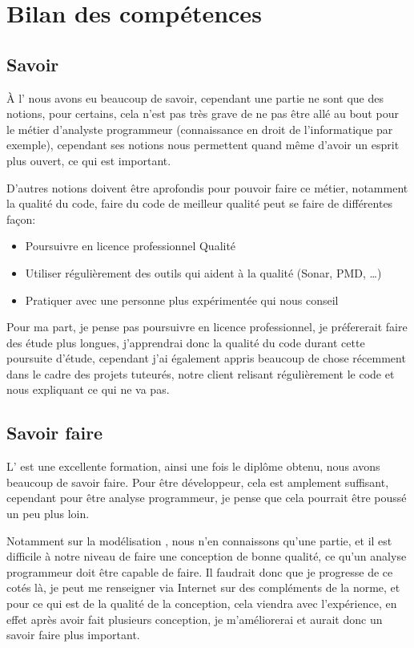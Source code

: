 \documentclass[12pt,a4paper,openany]{article}
\begin{document}
	\section{Bilan des compétences}
	\subsection{Savoir}
	À l' nous avons eu beaucoup de savoir, cependant une partie ne sont que des notions, pour certains, cela n'est pas
	très grave de ne pas être allé au bout pour le métier d'analyste programmeur (connaissance en droit de l'informatique par exemple), cependant
	ses notions nous permettent quand même d'avoir un esprit plus ouvert, ce qui est important. 

	D'autres notions doivent être aprofondis pour pouvoir faire ce métier, notamment la qualité du code, faire du code de meilleur qualité peut se
	faire de différentes façon:
	\begin{itemize}
		\item Poursuivre en licence professionnel Qualité 
		\item Utiliser régulièrement des outils qui aident à la qualité (Sonar, PMD, \ldots)
		\item Pratiquer avec une personne plus expérimentée qui nous conseil
	\end{itemize}
	Pour ma part, je pense pas poursuivre en licence professionnel, je préfererait faire des étude plus longues, j'apprendrai donc 
	la qualité du code durant cette poursuite d'étude, cependant j'ai également appris beaucoup de chose récemment dans le 
	cadre des projets tuteurés, notre client relisant régulièrement le code et nous expliquant ce qui ne va pas. 
	\subsection{Savoir faire}
		L' est une excellente formation, ainsi une fois le diplôme obtenu, nous avons beaucoup de savoir faire. Pour être développeur, 
		cela est amplement suffisant, cependant pour être analyse programmeur, je pense que cela pourrait être poussé un peu plus loin.
		
		Notamment sur la modélisation , nous n'en connaissons qu'une partie, et il est difficile à notre niveau de faire une
		conception de bonne qualité, ce qu'un analyse programmeur doit être capable de faire. Il faudrait donc que je progresse de ce cotés
		là, je peut me renseigner via Internet sur des compléments de la norme, et pour ce qui est de la qualité de la conception,
		cela viendra avec l'expérience, en effet après avoir fait plusieurs conception, je m'améliorerai et aurait donc un savoir faire
		plus important.
\end{document}

